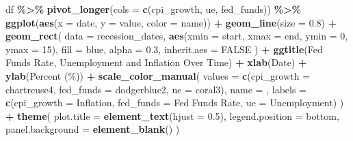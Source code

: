 \documentclass[
]{article}
\newenvironment{Shaded}{\begin{snugshade}}{\end{snugshade}}
\newcommand{\AttributeTok}[1]{\textcolor[rgb]{0.13,0.29,0.53}{#1}}
\newcommand{\ConstantTok}[1]{\textcolor[rgb]{0.56,0.35,0.01}{#1}}
\newcommand{\DecValTok}[1]{\textcolor[rgb]{0.00,0.00,0.81}{#1}}
\newcommand{\FloatTok}[1]{\textcolor[rgb]{0.00,0.00,0.81}{#1}}
\newcommand{\FunctionTok}[1]{\textcolor[rgb]{0.13,0.29,0.53}{\textbf{#1}}}
\newcommand{\NormalTok}[1]{#1}
\newcommand{\OtherTok}[1]{\textcolor[rgb]{0.56,0.35,0.01}{#1}}
\newcommand{\SpecialCharTok}[1]{\textcolor[rgb]{0.81,0.36,0.00}{\textbf{#1}}}
\newcommand{\StringTok}[1]{\textcolor[rgb]{0.31,0.60,0.02}{#1}}
\begin{document}
\begin{Shaded}
\begin{Highlighting}[]
\NormalTok{df }\SpecialCharTok{\%\textgreater{}\%}
  \FunctionTok{pivot\_longer}\NormalTok{(}\AttributeTok{cols =} \FunctionTok{c}\NormalTok{(cpi\_growth, ue, fed\_funds)) }\SpecialCharTok{\%\textgreater{}\%}
  \FunctionTok{ggplot}\NormalTok{(}\FunctionTok{aes}\NormalTok{(}\AttributeTok{x =}\NormalTok{ date, }\AttributeTok{y =}\NormalTok{ value, }\AttributeTok{color =}\NormalTok{ name)) }\SpecialCharTok{+}
  \FunctionTok{geom\_line}\NormalTok{(}\AttributeTok{size =} \FloatTok{0.8}\NormalTok{) }\SpecialCharTok{+} 
  \FunctionTok{geom\_rect}\NormalTok{(}
    \AttributeTok{data =}\NormalTok{ recession\_dates, }
    \FunctionTok{aes}\NormalTok{(}\AttributeTok{xmin =}\NormalTok{ start, }\AttributeTok{xmax =}\NormalTok{ end, }\AttributeTok{ymin =} \DecValTok{0}\NormalTok{, }\AttributeTok{ymax =} \DecValTok{15}\NormalTok{),}
    \AttributeTok{fill =} \StringTok{\textquotesingle{}blue\textquotesingle{}}\NormalTok{, }\AttributeTok{alpha =} \FloatTok{0.3}\NormalTok{, }\AttributeTok{inherit.aes =} \ConstantTok{FALSE}
\NormalTok{  ) }\SpecialCharTok{+} 
  \FunctionTok{ggtitle}\NormalTok{(}\StringTok{\textquotesingle{}Fed Funds Rate, Unemployment and Inflation Over Time\textquotesingle{}}\NormalTok{) }\SpecialCharTok{+}
  \FunctionTok{xlab}\NormalTok{(}\StringTok{\textquotesingle{}Date\textquotesingle{}}\NormalTok{) }\SpecialCharTok{+}
  \FunctionTok{ylab}\NormalTok{(}\StringTok{\textquotesingle{}Percent (\%)\textquotesingle{}}\NormalTok{) }\SpecialCharTok{+} 
  \FunctionTok{scale\_color\_manual}\NormalTok{(}
    \AttributeTok{values =} \FunctionTok{c}\NormalTok{(}\StringTok{\textquotesingle{}cpi\_growth\textquotesingle{}} \OtherTok{=} \StringTok{\textquotesingle{}chartreuse4\textquotesingle{}}\NormalTok{, }\StringTok{\textquotesingle{}fed\_funds\textquotesingle{}} \OtherTok{=} \StringTok{\textquotesingle{}dodgerblue2\textquotesingle{}}\NormalTok{, }\StringTok{\textquotesingle{}ue\textquotesingle{}} \OtherTok{=} \StringTok{\textquotesingle{}coral3\textquotesingle{}}\NormalTok{), }
    \AttributeTok{name =} \StringTok{\textquotesingle{}\textquotesingle{}}\NormalTok{, }
    \AttributeTok{labels =} \FunctionTok{c}\NormalTok{(}\StringTok{\textquotesingle{}cpi\_growth\textquotesingle{}} \OtherTok{=} \StringTok{\textquotesingle{}Inflation\textquotesingle{}}\NormalTok{, }\StringTok{\textquotesingle{}fed\_funds\textquotesingle{}} \OtherTok{=} \StringTok{\textquotesingle{}Fed Funds Rate\textquotesingle{}}\NormalTok{, }\StringTok{\textquotesingle{}ue\textquotesingle{}} \OtherTok{=} \StringTok{\textquotesingle{}Unemployment\textquotesingle{}}\NormalTok{)}
\NormalTok{  ) }\SpecialCharTok{+}
  \FunctionTok{theme}\NormalTok{(}
    \AttributeTok{plot.title =} \FunctionTok{element\_text}\NormalTok{(}\AttributeTok{hjust =} \FloatTok{0.5}\NormalTok{),}
    \AttributeTok{legend.position =} \StringTok{\textquotesingle{}bottom\textquotesingle{}}\NormalTok{,}
    \AttributeTok{panel.background =} \FunctionTok{element\_blank}\NormalTok{()}
\NormalTok{  )}
\end{Highlighting}
\end{Shaded}
\end{document}
